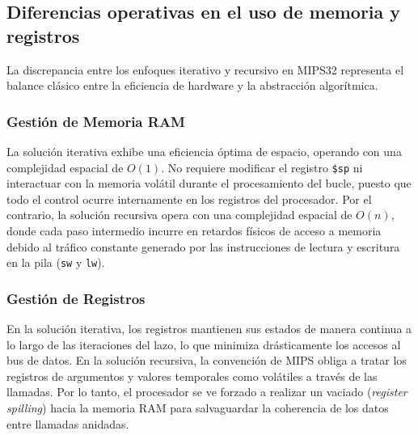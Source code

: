 \documentclass[12pt,letterpaper]{article}
\begin{document}
\subsection{Diferencias operativas en el uso de memoria y registros}
La discrepancia entre los enfoques iterativo y recursivo en MIPS32 representa el balance clásico entre la eficiencia de hardware y la abstracción algorítmica.

\subsubsection{Gestión de Memoria RAM}
La solución iterativa exhibe una eficiencia óptima de espacio, operando con una complejidad espacial de $O(1)$. No requiere modificar el registro \texttt{\$sp} ni interactuar con la memoria volátil durante el procesamiento del bucle, puesto que todo el control ocurre internamente en los registros del procesador. Por el contrario, la solución recursiva opera con una complejidad espacial de $O(n)$, donde cada paso intermedio incurre en retardos físicos de acceso a memoria debido al tráfico constante generado por las instrucciones de lectura y escritura en la pila (\texttt{sw} y \texttt{lw}).

\subsubsection{Gestión de Registros}
En la solución iterativa, los registros mantienen sus estados de manera continua a lo largo de las iteraciones del lazo, lo que minimiza drásticamente los accesos al bus de datos. En la solución recursiva, la convención de MIPS obliga a tratar los registros de argumentos y valores temporales como volátiles a través de las llamadas. Por lo tanto, el procesador se ve forzado a realizar un vaciado (\textit{register spilling}) hacia la memoria RAM para salvaguardar la coherencia de los datos entre llamadas anidadas.
\end{document}
